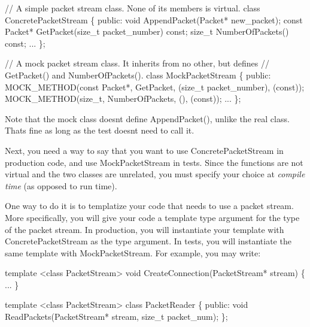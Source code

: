 \begin{DoxyCode}
\textcolor{comment}{// A simple packet stream class.  None of its members is virtual.}
\textcolor{keyword}{class }ConcretePacketStream \{
 \textcolor{keyword}{public}:
  \textcolor{keywordtype}{void} AppendPacket(Packet* new\_packet);
  \textcolor{keyword}{const} Packet* GetPacket(\textcolor{keywordtype}{size\_t} packet\_number) \textcolor{keyword}{const};
  \textcolor{keywordtype}{size\_t} NumberOfPackets() \textcolor{keyword}{const};
  ...
\};

\textcolor{comment}{// A mock packet stream class.  It inherits from no other, but defines}
\textcolor{comment}{// GetPacket() and NumberOfPackets().}
\textcolor{keyword}{class }MockPacketStream \{
 \textcolor{keyword}{public}:
  MOCK\_METHOD(\textcolor{keyword}{const} Packet*, GetPacket, (\textcolor{keywordtype}{size\_t} packet\_number), (\textcolor{keyword}{const}));
  MOCK\_METHOD(\textcolor{keywordtype}{size\_t}, NumberOfPackets, (), (\textcolor{keyword}{const}));
  ...
\};
\end{DoxyCode}


Note that the mock class doesn\textquotesingle{}t define {\ttfamily Append\+Packet()}, unlike the real class. That\textquotesingle{}s fine as long as the test doesn\textquotesingle{}t need to call it.

Next, you need a way to say that you want to use {\ttfamily Concrete\+Packet\+Stream} in production code, and use {\ttfamily Mock\+Packet\+Stream} in tests. Since the functions are not virtual and the two classes are unrelated, you must specify your choice at {\itshape compile time} (as opposed to run time).

One way to do it is to templatize your code that needs to use a packet stream. More specifically, you will give your code a template type argument for the type of the packet stream. In production, you will instantiate your template with {\ttfamily Concrete\+Packet\+Stream} as the type argument. In tests, you will instantiate the same template with {\ttfamily Mock\+Packet\+Stream}. For example, you may write\+:


\begin{DoxyCode}
\textcolor{keyword}{template} <\textcolor{keyword}{class} PacketStream>
\textcolor{keywordtype}{void} CreateConnection(PacketStream* stream) \{ ... \}

\textcolor{keyword}{template} <\textcolor{keyword}{class} PacketStream>
\textcolor{keyword}{class }PacketReader \{
 \textcolor{keyword}{public}:
  \textcolor{keywordtype}{void} ReadPackets(PacketStream* stream, \textcolor{keywordtype}{size\_t} packet\_num);
\};
\end{DoxyCode}


